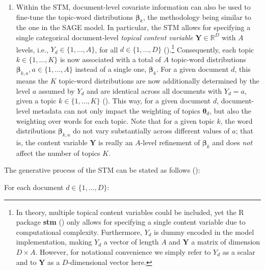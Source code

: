 \begin{enumerate}[label=(\roman*)]
\item Within the STM, document-level covariate information can also be used to fine-tune the topic-word distributions $\boldsymbol{\beta}_k$, the methodology being similar to the one in the SAGE model. In particular, the STM allows for specifying a single categorical document-level \textit{topical content variable} $\boldsymbol{Y}\in \mathbb{R}^D$ with $A$ levels, i.e., $Y_d \in \{1,\dots,A\}$, for all $d \in \{1,\dots,D\}$ (\citealp{stm}).\footnote{In theory, multiple topical content variables could be included, yet the R package \textbf{stm} (\citealp{stm}) only allows for specifying a single content variable due to computational complexity. Furthermore, $Y_d$ is dummy encoded in the model implementation, making $Y_d$ a vector of length $A$ and $\boldsymbol{Y}$ a matrix of dimension $D \times A$. However, for notational convenience we simply refer to $Y_d$ as a scalar and to $\boldsymbol{Y}$ as a $D$-dimensional vector here.} Consequently, each topic $k \in \{1,\dots,K\}$ is now associated with a total of $A$ topic-word distributions $\boldsymbol{\beta}_{k,a}, a \in \{1,\dots,A\}$ instead of a single one, $\boldsymbol{\beta}_k$. For a given document $d$, this means the $K$ topic-word distributions are now additionally determined by the level $a$ assumed by $Y_d$ and are identical across all documents with $Y_d = a$, given a topic $k \in \{1,\dots,K\}$ (\citealp{roberts2016model}). This way, for a given document $d$, document-level metadata can not only impact the weighting of topics $\boldsymbol{\theta}_d$, but also the weighting over words for each topic. Note that for a given topic $k$, the word distributions $\boldsymbol{\beta}_{k,a}$ do not vary substantially across different values of $a$; that is, the content variable $\boldsymbol{Y}$ is really an $A$-level refinement of $\boldsymbol{\beta}_k$ and does \textit{not} affect the number of topics $K$.

\end{enumerate}

\noindent
The generative process of the STM can be stated as follows (\citealp{roberts2016model}):

\vspace{0.25cm}
\noindent
For each document $d \in \{1,\dots,D\}$:

